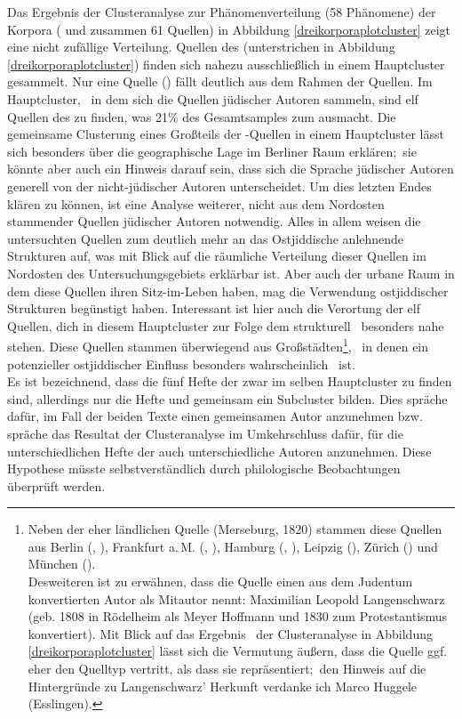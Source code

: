     Das Ergebnis der Clusteranalyse zur Phänomenverteilung (58 Phänomene) der Korpora ( und  zusammen 61 Quellen) in Abbildung \ref{dreikorporaplotcluster} zeigt eine nicht zufällige Verteilung. Quellen des  (unterstrichen in Abbildung \ref{dreikorporaplotcluster}) finden sich nahezu ausschließlich in einem Hauptcluster gesammelt. Nur eine Quelle () fällt deutlich aus dem Rahmen der  Quellen. Im \,%
    Hauptcluster, \,%
    in dem sich die Quellen jüdischer Autoren sammeln, sind elf Quellen des  zu finden, was 21\% des Gesamtsamples zum  ausmacht. 
Die gemeinsame Clusterung eines Großteils der -Quellen in einem Hauptcluster lässt sich besonders über die geographische Lage im Berliner Raum erklären;\, sie könnte aber auch ein Hinweis darauf sein, dass sich die Sprache jüdischer Autoren generell von der nicht-jüdischer Autoren unterscheidet. Um dies letzten Endes klären zu können, ist eine Analyse weiterer, nicht aus dem Nordosten stammender Quellen jüdischer Autoren notwendig. Alles in allem weisen die untersuchten Quellen zum  deutlich mehr an das Ostjiddische anlehnende Strukturen auf, was mit Blick auf die räumliche Verteilung dieser Quellen im Nordosten des Untersuchungsgebiets erklärbar ist. Aber auch der urbane Raum in dem diese Quellen ihren Sitz-im-Leben haben, mag die Verwendung ostjiddischer Strukturen begünstigt haben.  Interessant ist hier auch die Verortung der elf  Quellen, dich in diesem Hauptcluster zur Folge dem  strukturell \,%
besonders nahe stehen. Diese Quellen stammen überwiegend aus Großstädten\footnote{Neben der eher ländlichen Quelle  (Merseburg, 1820) stammen diese Quellen aus Berlin (, ), Frankfurt a.\,M. (, ), Hamburg (, ), Leipzig (), Zürich () und München (). \\
Desweiteren ist zu erwähnen, dass die Quelle  einen aus dem Judentum konvertierten Autor als Mitautor nennt: Maximilian Leopold Langenschwarz (geb. 1808 in Rödelheim als Meyer Hoffmann und 1830 zum Protestantismus konvertiert). Mit Blick auf das Ergebnis \,%
der Clusteranalyse in Abbildung \ref{dreikorporaplotcluster} lässt sich die Vermutung äußern, dass die Quelle  ggf. eher den Quelltyp  vertritt, als dass sie  repräsentiert;\, den Hinweis auf die Hintergründe zu Langenschwarz' Herkunft verdanke ich Marco Huggele (Esslingen).}, \,%
 in denen ein potenzieller ostjiddischer Einfluss besonders wahrscheinlich \,%
ist.\\ 
Es ist bezeichnend, dass die fünf Hefte der  zwar im selben Hauptcluster zu finden sind, allerdings nur die Hefte  und  gemeinsam ein Subcluster bilden. Dies spräche dafür, im Fall der beiden Texte einen gemeinsamen Autor anzunehmen bzw. spräche
das Resultat der Clusteranalyse im Umkehrschluss dafür, für die unterschiedlichen Hefte der  auch unterschiedliche Autoren anzunehmen. Diese Hypothese müsste selbstverständlich durch philologische Beobachtungen überprüft werden. 

